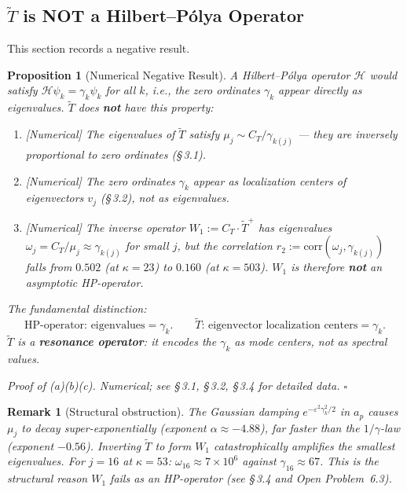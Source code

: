 \documentclass[11pt]{article}
\newtheorem{proposition}[theorem]{Proposition}
\newtheorem*{remark}{Remark}
\newcommand{\Tt}{\widetilde{T}}
\newcommand{\CT}{C_{T}}
\newcommand{\Wone}{W_1}
\begin{document}
\subsection{$\Tt$ is NOT a Hilbert--P\'olya Operator}

This section records a negative result.

\begin{proposition}[Numerical Negative Result]\label{prop:not-HP}
A Hilbert--P\'olya operator $\mathcal{H}$ would satisfy
$\mathcal{H}\psi_k = \gamma_k\psi_k$ for all $k$,
i.e., the zero ordinates $\gamma_k$ appear directly as eigenvalues.
$\Tt$ does \textbf{not} have this property:
\begin{enumerate}[label=(\alph*)]
\item \emph{[Numerical]} The eigenvalues of $\Tt$ satisfy
  $\mu_j\sim\CT/\gamma_{k(j)}$ --- they are \emph{inversely} proportional
  to zero ordinates (\S\,3.1).
\item \emph{[Numerical]} The zero ordinates $\gamma_k$ appear as
  \emph{localization centers} of eigenvectors $v_j$ (\S\,3.2),
  not as eigenvalues.
\item \emph{[Numerical]} The inverse operator $\Wone := \CT\cdot\Tt^+$
  has eigenvalues $\omega_j = \CT/\mu_j \approx \gamma_{k(j)}$
  for small $j$, but the correlation
  $r_2 := \mathrm{corr}(\omega_j, \gamma_{k(j)})$
  falls from $0.502$ (at $\kappa=23$) to $0.160$ (at $\kappa=503$).
  $\Wone$ is therefore \textbf{not} an asymptotic HP-operator.
\end{enumerate}
\emph{The fundamental distinction:}
\[
\text{HP-operator: eigenvalues} = \gamma_k.
\qquad
\Tt\text{: eigenvector localization centers} = \gamma_k.
\]
$\Tt$ is a \textbf{resonance operator}: it encodes the $\gamma_k$
as mode centers, not as spectral values.

\emph{Proof of (a)(b)(c).}
Numerical; see \S\,3.1, \S\,3.2, \S\,3.4 for detailed data. $\square$
\end{proposition}

\begin{remark}[Structural obstruction]
The Gaussian damping $e^{-\varepsilon^2\gamma_k^2/2}$ in $a_p$ causes
$\mu_j$ to decay super-exponentially (exponent $\alpha\approx -4.88$),
far faster than the $1/\gamma$-law (exponent $-0.56$).
Inverting $\Tt$ to form $\Wone$ catastrophically amplifies the smallest
eigenvalues.
For $j=16$ at $\kappa=53$:
$\omega_{16}\approx 7\times 10^6$ against $\gamma_{16}\approx 67$.
This is the structural reason $\Wone$ fails as an HP-operator
(see \S\,3.4 and Open Problem~6.3).
\end{remark}
\end{document}
